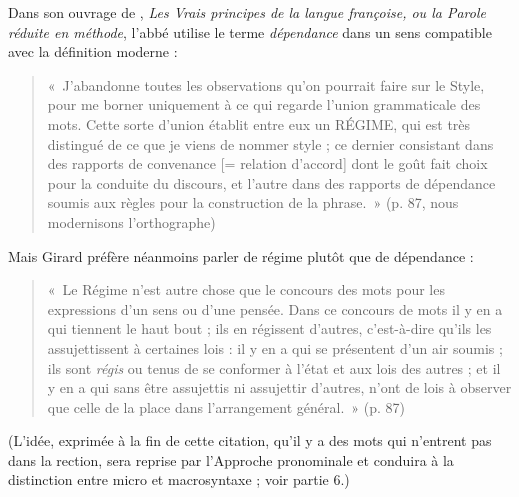 {    Dans son ouvrage de \citeyear{girard1747vrais}, \textit{Les Vrais principes de la langue françoise, ou la Parole réduite en méthode}, l’abbé  utilise le terme \textit{dépendance} dans un sens compatible avec la définition moderne :
    \begin{quote}
    «~J’abandonne toutes les observations qu’on pourrait faire sur le Style, pour me borner uniquement à ce qui regarde l’union grammaticale des mots. Cette sorte d’union établit entre eux un RÉGIME, qui est très distingué de ce que je viens de nommer style ; ce dernier consistant dans des rapports de convenance [= relation d’accord] dont le goût fait choix pour la conduite du discours, et l’autre dans des rapports de dépendance soumis aux règles pour la construction de la phrase.~» (p. 87, nous modernisons l’orthographe)\end{quote}
    Mais Girard préfère néanmoins parler de régime plutôt que de dépendance : 
    \begin{quote}«~Le Régime n’est autre chose que le concours des mots pour les expressions d’un sens ou d’une pensée. Dans ce concours de mots il y en a qui tiennent le haut bout ; ils en régissent d’autres, c’est-à-dire qu’ils les assujettissent à certaines lois : il y en a qui se présentent d’un air soumis ; ils sont \textit{régis} ou tenus de se conformer à l’état et aux lois des autres ; et il y en a qui sans être assujettis ni assujettir d’autres, n’ont de lois à observer que celle de la place dans l’arrangement général.~» (p. 87)\end{quote}
    
  (L’idée, exprimée à la fin de cette citation, qu’il y a des mots qui n’entrent pas dans la rection, sera reprise par l’Approche pronominale et conduira à la distinction entre micro et macrosyntaxe ; voir partie 6.)

}
